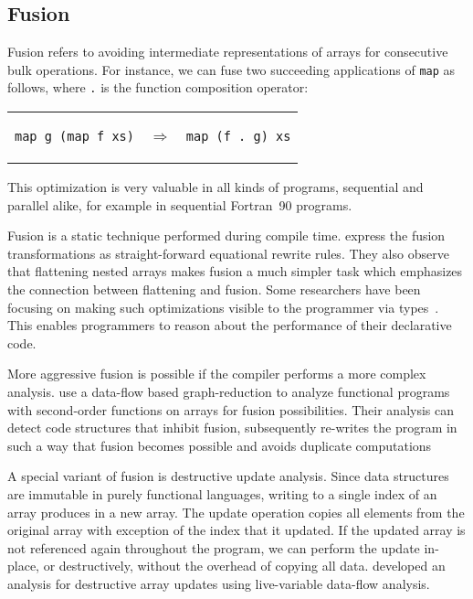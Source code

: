 \documentclass[a4paper]{article}
\begin{document}
\subsection{Fusion}
\label{sec:fusion}

Fusion refers to avoiding intermediate representations of arrays for
consecutive bulk operations. For instance, we can fuse two succeeding
applications of \texttt{map} as follows, where \texttt{.} is the
function composition operator:

\begin{center}
  \begin{tabular}{ccc}
\begin{lstlisting}[language=ML]
map g (map f xs)
\end{lstlisting}
    & $\Longrightarrow$ &
\begin{lstlisting}[language=ML]
map (f . g) xs
\end{lstlisting}
  \end{tabular}
\end{center}

This optimization is very valuable in all kinds of programs,
sequential and parallel alike, for example in sequential
Fortran~90 programs\cite{Hwang:1995:AOS:209936.209949}.

Fusion is a static technique performed during compile
time. \citet{Chakravarty:2001:FAF:507635.507661} express the fusion
transformations as straight-forward equational rewrite rules. They
also observe that flattening nested arrays makes fusion a much simpler
task which emphasizes the connection between flattening and
fusion. Some researchers have been focusing on making such
optimizations visible to the programmer via
types~\cite{Lippmeier:2012:GPA:2364506.2364511}. This enables
programmers to reason about the performance of their declarative code.

More aggressive fusion is possible if the compiler performs a more
complex analysis. \citet{Henriksen:2013:TGA:2502323.2502328} use a
data-flow based graph-reduction to analyze functional programs with
second-order functions on arrays for fusion possibilities. Their
analysis can detect code structures that inhibit fusion, subsequently
re-writes the program in such a way that fusion becomes possible and
avoids duplicate computations

A special variant of fusion is destructive update analysis. Since data
structures are immutable in purely functional languages, writing to a
single index of an array produces in a new array. The update operation
copies all elements from the original array with exception of the
index that it updated. If the updated array is not referenced again
throughout the program, we can perform the update in-place, or
destructively, without the overhead of copying all
data. \citet{Sastry:1994:PDU:182409.182486} developed an analysis for
destructive array updates using live-variable data-flow analysis.
\end{document}
